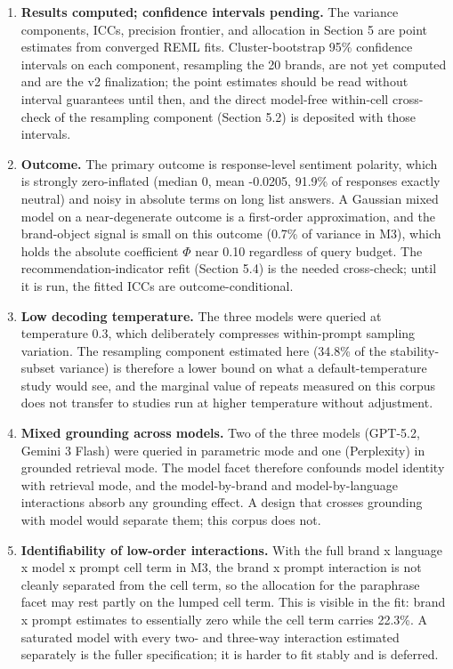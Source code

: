 \documentclass[pdflatex,sn-mathphys-num]{sn-jnl}
\begin{document}
\begin{enumerate}
\def\labelenumi{\arabic{enumi}.}
\item
  \textbf{Results computed; confidence intervals pending.} The variance components, ICCs, precision frontier, and allocation in Section 5 are point estimates from converged REML fits. Cluster-bootstrap 95\% confidence intervals on each component, resampling the 20 brands, are not yet computed and are the v2 finalization; the point estimates should be read without interval guarantees until then, and the direct model-free within-cell cross-check of the resampling component (Section 5.2) is deposited with those intervals.
\item
  \textbf{Outcome.} The primary outcome is response-level sentiment polarity, which is strongly zero-inflated (median 0, mean -0.0205, 91.9\% of responses exactly neutral) and noisy in absolute terms on long list answers. A Gaussian mixed model on a near-degenerate outcome is a first-order approximation, and the brand-object signal is small on this outcome (0.7\% of variance in M3), which holds the absolute coefficient \(\Phi\) near 0.10 regardless of query budget. The recommendation-indicator refit (Section 5.4) is the needed cross-check; until it is run, the fitted ICCs are outcome-conditional.
\item
  \textbf{Low decoding temperature.} The three models were queried at temperature 0.3, which deliberately compresses within-prompt sampling variation. The resampling component estimated here (34.8\% of the stability-subset variance) is therefore a lower bound on what a default-temperature study would see, and the marginal value of repeats measured on this corpus does not transfer to studies run at higher temperature without adjustment.
\item
  \textbf{Mixed grounding across models.} Two of the three models (GPT-5.2, Gemini 3 Flash) were queried in parametric mode and one (Perplexity) in grounded retrieval mode. The model facet therefore confounds model identity with retrieval mode, and the model-by-brand and model-by-language interactions absorb any grounding effect. A design that crosses grounding with model would separate them; this corpus does not.
\item
  \textbf{Identifiability of low-order interactions.} With the full brand x language x model x prompt cell term in M3, the brand x prompt interaction is not cleanly separated from the cell term, so the allocation for the paraphrase facet may rest partly on the lumped cell term. This is visible in the fit: brand x prompt estimates to essentially zero while the cell term carries 22.3\%. A saturated model with every two- and three-way interaction estimated separately is the fuller specification; it is harder to fit stably and is deferred.

\end{enumerate}
\end{document}
